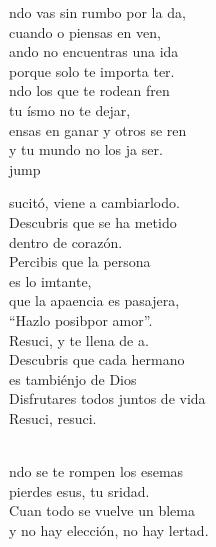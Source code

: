 \begin{cancion}%
	ndo vas sin rumbo por la da,\\
	cuando o piensas en ven,\\
	ando no encuentras una ida\\
	porque solo te importa ter.\\
	ndo los que te rodean fren\\
	tu ísmo no te dejar,\\
	ensas en ganar y otros se ren\\
	y tu mundo no los ja ser.\\jump\\
	\begin{chorus}%
	sucitó, viene a cambiarlodo.\\
	Descubris que se ha metido  \\
	dentro de corazón.\\
	Percibis que la persona  \\
	es lo imtante,\\
	que la apaencia es pasajera,\\
	“Hazlo posibpor amor”.\\
	Resuci, y te llena de a. \\
	Descubris que cada hermano  \\
	es tambiénjo de Dios\\
	Disfrutares todos juntos de vida\\
	Resuci, resuci. \\
	\end{chorus}%
	\jump\\
	ndo se te rompen los esemas\\
	pierdes esus, tu sridad.\\
	Cuan todo se vuelve un blema\\
	y no hay elección, no hay lertad.\\

\end{cancion}
